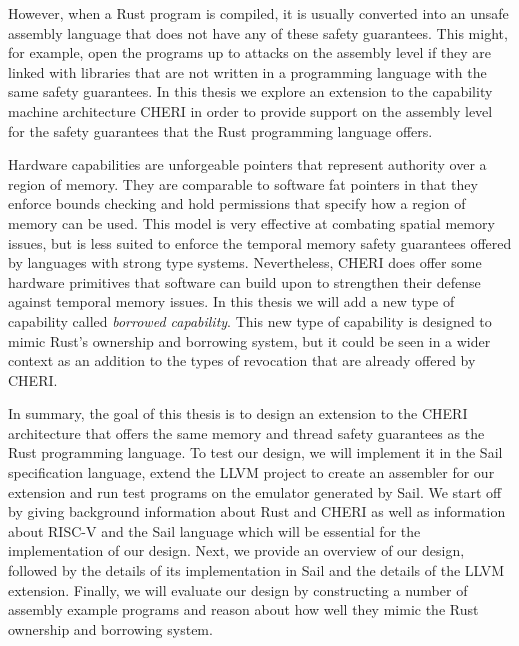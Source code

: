 However, when a Rust program is compiled, it is usually converted into an unsafe assembly language that does not have any of these safety guarantees.
This might, for example, open the programs up to attacks on the assembly level if they are linked with libraries that are not written in a programming language with the same safety guarantees.
In this thesis we explore an extension to the capability machine architecture CHERI in order to provide support on the assembly level for the safety guarantees that the Rust programming language offers.

Hardware capabilities are unforgeable pointers that represent authority over a region of memory.
They are comparable to software fat pointers in that they enforce bounds checking and hold permissions that specify how a region of memory can be used.
This model is very effective at combating spatial memory issues, but is less suited to enforce the temporal memory safety guarantees offered by languages with strong type systems.
Nevertheless, CHERI does offer some hardware primitives that software can build upon to strengthen their defense against temporal memory issues.
In this thesis we will add a new type of capability called \textit{borrowed capability}.
This new type of capability is designed to mimic Rust's ownership and borrowing system, but it could be seen in a wider context as an addition to the types of revocation that are already offered by CHERI.

In summary, the goal of this thesis is to design an extension to the CHERI architecture that offers the same memory and thread safety guarantees as the Rust programming language.
To test our design, we will implement it in the Sail specification language, extend the LLVM project to create an assembler for our extension and run test programs on the emulator generated by Sail.
We start off by giving background information about Rust and CHERI as well as information about RISC-V and the Sail language which will be essential for the implementation of our design.
Next, we provide an overview of our design, followed by the details of its implementation in Sail and the details of the LLVM extension.
Finally, we will evaluate our design by constructing a number of assembly example programs and reason about how well they mimic the Rust ownership and borrowing system.

